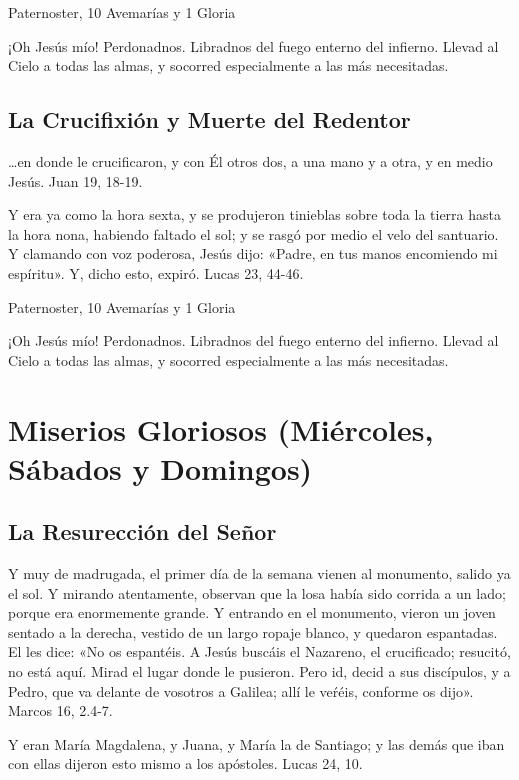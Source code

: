 \documentclass[a4paper,11pt, oneside]{report}
\let\footnote=\endnote
\begin{document}
        \medskip
         Paternoster, 10 Avemarías y 1 Gloria
        
        \medskip
        ¡Oh Jesús mío! Perdonadnos. Libradnos del fuego enterno del infierno. Llevad al Cielo a todas las almas, y socorred especialmente a las más necesitadas.
      
      \subsection*{La Crucifixión y Muerte del Redentor}
        {\ldots}en donde le crucificaron, y con Él otros dos, a una mano y a otra, y en medio Jesús. Juan 19, 18-19.

        \medskip
        Y era ya como la hora sexta, y se produjeron tinieblas sobre toda la tierra hasta la hora nona, habiendo faltado el sol; y se rasgó por medio 
        el velo del santuario. Y clamando con voz poderosa, Jesús dijo: «Padre, en tus manos encomiendo mi espíritu\footnote{Sal. 30, 6}». 
        Y, dicho esto, expiró. Lucas 23, 44-46.
        
         Paternoster, 10 Avemarías y 1 Gloria
        
        \medskip
        ¡Oh Jesús mío! Perdonadnos. Libradnos del fuego enterno del infierno. Llevad al Cielo a todas las almas, y socorred especialmente a las más necesitadas.
        
    \section*{Miserios Gloriosos (Miércoles, Sábados y Domingos)}
      \subsection*{La Resurección del Señor}
        Y muy de madrugada, el primer día de la semana vienen al monumento, salido ya el sol. Y mirando atentamente, observan que la losa había
        sido corrida a un lado; porque era enormemente grande. Y entrando en el monumento, vieron un joven sentado a la derecha, vestido de un largo
        ropaje blanco, y quedaron espantadas. El les dice: «No os espantéis. A Jesús buscáis el Nazareno, el crucificado; resucitó, no está aquí. Mirad
        el lugar donde le pusieron. Pero id, decid a sus discípulos, y a Pedro, que va delante de vosotros a Galilea; allí le veŕéis, conforme os dijo».
        Marcos 16, 2.4-7.

        \medskip
        Y eran María Magdalena, y Juana, y María la de Santiago; y las demás que iban con ellas dijeron esto mismo a los apóstoles. 
        Lucas 24, 10.
\end{document}
